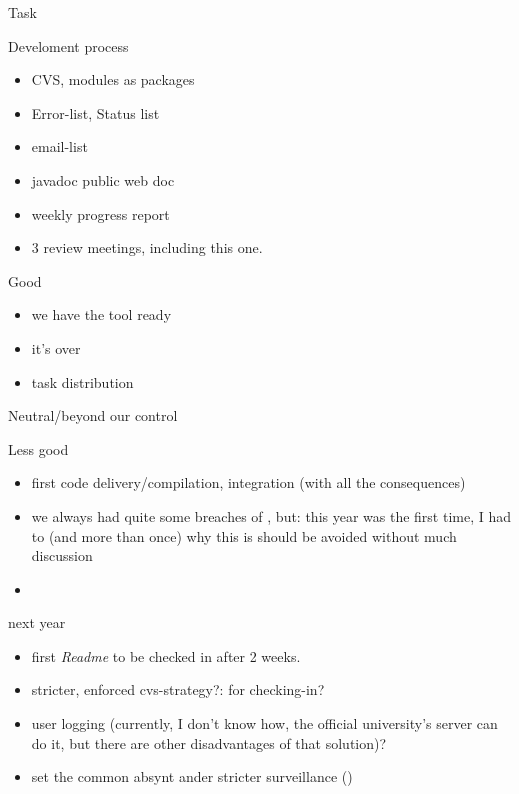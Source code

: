 


\begin{myslide}{Task}
  
\end{myslide}


\begin{myslide}{Develoment process}
  \begin{itemize}
  \item CVS, modules as packages
  \item Error-list, Status list
  \item email-list
  \item javadoc public web doc
  \item weekly progress report
  \item 3 review meetings, including this one. 
  \end{itemize}
\end{myslide}


\begin{myslide}{Good}
  \begin{itemize}
  \item we have the tool ready
  \item it's over
  \item task distribution
  \end{itemize}
  
\end{myslide}
\begin{myslide}{Neutral/beyond our control}
  
\end{myslide}

\begin{myslide}{Less good}
  \begin{itemize}
  \item {} first code delivery/compilation,
     integration (with all the consequences)
  \item we always had quite some breaches of , but:
    this year was the first time, I had to  (and more
    than once) why this is should be avoided without much discussion
  \item 
  \end{itemize}
  
\end{myslide}
\begin{myslide}{next year}
  \begin{itemize}
  \item first \emph{Readme}  to be checked in after 2
    weeks.
  \item stricter, enforced cvs-strategy?:  for checking-in?
  \item user logging (currently, I don't know how, the official
    university's server can do it, but there are other disadvantages of
    that solution)?
  \item set the common absynt ander stricter surveillance
    ()
  \end{itemize}
\end{myslide}


